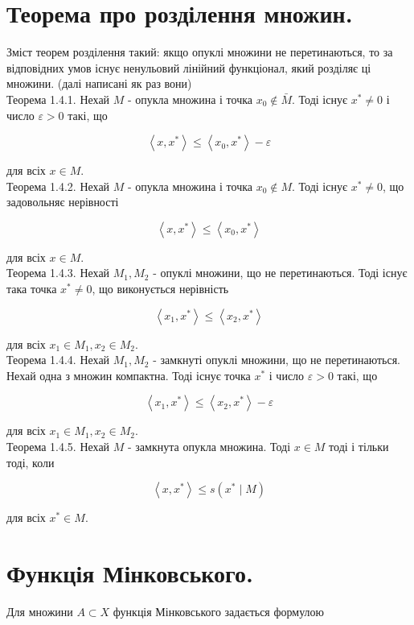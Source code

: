 \documentclass[10pt]{article}
\begin{document}
\section*{Теорема про розділення множин.}
Зміст теорем розділення такий: якщо опуклі множини не перетинаються, то за відповідних умов існує ненульовий лінійний функціонал, який розділяє ці множини. (далі написані як раз вони)\\
Теорема 1.4.1. Нехай $M$ - опукла множина і точка $x_{0} \notin \bar{M}$. Тоді існує $x^{*} \neq 0$ і число $\varepsilon>0$ такі, що

$$
\left\langle x, x^{*}\right\rangle \leq\left\langle x_{0}, x^{*}\right\rangle-\varepsilon
$$

для всіх $x \in M$.\\
Теорема 1.4.2. Нехай $M$ - опукла множина і точка $x_{0} \notin M$. Тоді існує $x^{*} \neq 0$, що задовольняє нерівності

$$
\left\langle x, x^{*}\right\rangle \leq\left\langle x_{0}, x^{*}\right\rangle
$$

для всіх $x \in M$.\\
Теорема 1.4.3. Нехай $M_{1}, M_{2}$ - опуклі множини, що не перетинаються. Тоді існує така точка $x^{*} \neq 0$, що виконується нерівність

$$
\left\langle x_{1}, x^{*}\right\rangle \leq\left\langle x_{2}, x^{*}\right\rangle
$$

для всіх $x_{1} \in M_{1}, x_{2} \in M_{2}$.\\
Теорема 1.4.4. Нехай $M_{1}, M_{2}$ - замкнуті опуклі множини, що не перетинаються. Нехай одна з множин компактна. Тоді існує точка $x^{*}$ і число $\varepsilon>0$ такі, що

$$
\left\langle x_{1}, x^{*}\right\rangle \leq\left\langle x_{2}, x^{*}\right\rangle-\varepsilon
$$

для всіх $x_{1} \in M_{1}, x_{2} \in M_{2}$.\\
Теорема 1.4.5. Нехай $M$ - замкнута опукла множина. Тоді $x \in M$ тоді і тільки тоді, коли

$$
\left\langle x, x^{*}\right\rangle \leq s\left(x^{*} \mid M\right)
$$

для всіх $x^{*} \in M$.

\section*{Функція Мінковського.}
Для множини $A \subset X$ функція Мінковського задається формулою
\end{document}
